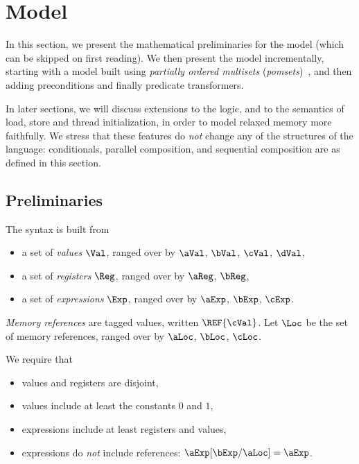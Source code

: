 \section{Model}
\label{sec:model}


In this section, we present the mathematical preliminaries for the
model (which can be skipped on first reading). We then present the
model incrementally, starting with a model built using
\emph{partially ordered multisets}
(\emph{pomsets})~\cite{GISCHER1988199,Plotkin:1997:TSP:266557.266600},
and then adding preconditions and finally predicate transformers.

In later sections, we will discuss extensions to the logic, and to the
semantics of load, store and thread initialization, in order to model
relaxed memory more faithfully. We stress that these features do
\emph{not} change any of the structures of the language: conditionals,
parallel composition, and sequential composition are as defined in this section.

\subsection{Preliminaries}
\label{sec:prelim}
The syntax is built from
\begin{itemize}
\item a set of \emph{values} $\Val$, ranged over by
  $\aVal$, $\bVal$, $\cVal$, $\dVal$,
\item a set of \emph{registers} $\Reg$, ranged over by
  $\aReg$, $\bReg$,
\item a set of \emph{expressions} $\Exp$, ranged over by
  $\aExp$, $\bExp$,  $\cExp$.
\end{itemize}

\emph{Memory references} are tagged values, written $\REF{\cVal}$.  Let $\Loc$
be the set of memory references, ranged over by $\aLoc$, $\bLoc$, $\cLoc$.

We require that
\begin{itemize}
\item values and registers are disjoint, 
\item values include at least the constants $0$ and $1$,  
\item expressions include at least registers and values, 
\item expressions do \emph{not} include references: $\aExp[\bExp/\aLoc]=\aExp$.
\end{itemize}


